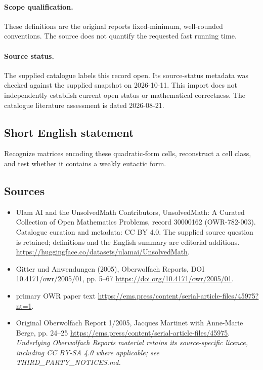 \documentclass[11pt]{article}
\begin{document}
\paragraph{Scope qualification.}
These definitions are the original report\textquotesingle s fixed-minimum, well-rounded conventions. The source does not quantify the requested fast running time.
\paragraph{Source status.}
The supplied catalogue labels this record open. Its source-status metadata was checked against the supplied snapshot on 2026-10-11. This import does not independently establish current open status or mathematical correctness. The catalogue literature assessment is dated 2026-08-21.
\subsection{Short English statement}
Recognize matrices encoding these quadratic-form cells, reconstruct a cell class, and test whether it contains a weakly eutactic form.
\subsection{Sources}
\begin{itemize}
\item[S1] Ulam AI and the UnsolvedMath Contributors, UnsolvedMath: A Curated Collection of Open Mathematics Problems, record 30000162 (OWR-782-003). Catalogue curation and metadata: CC BY 4.0. The supplied source question is retained; definitions and the English summary are editorial additions.
\url{https://huggingface.co/datasets/ulamai/UnsolvedMath}.
\item[S2] Gitter und Anwendungen (2005), Oberwolfach Reports, DOI 10.4171/owr/2005/01, pp. 5--67
\url{https://doi.org/10.4171/owr/2005/01}.
\item[S3] primary OWR paper text
\url{https://ems.press/content/serial-article-files/45975?nt=1}.
\item[S4] Original Oberwolfach Report 1/2005, Jacques Martinet with Anne-Marie Berge, pp. 24--25
\url{https://ems.press/content/serial-article-files/45975}.
\textit{Underlying Oberwolfach Reports material retains its source-specific licence, including CC BY-SA 4.0 where applicable; see THIRD\_PARTY\_NOTICES.md.}
\end{itemize}
\end{document}

